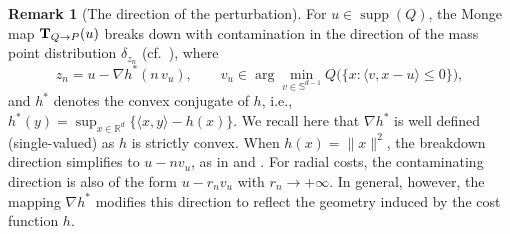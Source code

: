 \documentclass[11pt]{article}
\newcommand{\RR}{\mathbb{R}}
\newcommand{\R}{\RR}
\theoremstyle{plain}
\theoremstyle{definition}\newtheorem{definition}[theorem]{Definition}
\newtheorem{remark}[theorem]{Remark}
\theoremstyle{remark}
\begin{document}
\begin{remark}[The direction of the perturbation]\label{rem:direction} For \(u \in \operatorname{supp}(Q)\), the Monge map \({\bf T}_{Q \to P}(u)\) breaks down with contamination in the direction of the mass point distribution
\(\delta_{z_n}\) (cf.~), where 
\[
z_n = u - \nabla h^{*}(n\, v_u), 
\qquad 
v_u \in \arg\min_{v\in \mathbb{S}^{d-1}} Q\big(\{x : \langle v, x - u\rangle \le 0\}\big),
\]
and $h^*$ denotes the convex conjugate of $h$, i.e.,   $h^*(y) = \sup_{x \in \R^d} \{ \langle x, y \rangle - h(x) \}  $.  We recall here that $\nabla h^*$ is well defined (single-valued) as $h$ is strictly convex.
When \(h(x) = \|x\|^2\), the breakdown direction simplifies to \(u - n v_u\), as in 
\cite{Avella-Gonzalez.25} and \cite{paindaveine:passeggeri2024}. 
For radial costs, the contaminating direction is also of the form \(u - r_n v_u\) with \(r_n \to +\infty\). 
In general, however, the mapping \(\nabla h^{*}\) modifies this direction to reflect the geometry induced by the cost function \(h\).

\end{remark}
%
%
\end{document}
